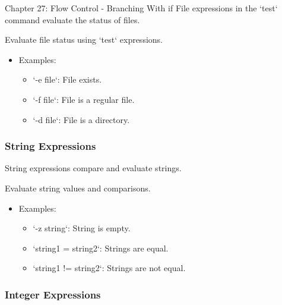 \begin{notes}{Chapter 27: Flow Control - Branching With if}
    File expressions in the `test` command evaluate the status of files.
    
    \begin{highlight}
    
    Evaluate file status using `test` expressions.
    
    \begin{itemize}
        \item Examples:
        \begin{itemize}
            \item `-e file`: File exists.
            \item `-f file`: File is a regular file.
            \item `-d file`: File is a directory.
        \end{itemize}
    \end{itemize}
    
    \end{highlight}
    
    \subsubsection*{String Expressions}
    
    String expressions compare and evaluate strings.
    
    \begin{highlight}
    
    Evaluate string values and comparisons.
    
    \begin{itemize}
        \item Examples:
        \begin{itemize}
            \item `-z string`: String is empty.
            \item `string1 = string2`: Strings are equal.
            \item `string1 != string2`: Strings are not equal.
        \end{itemize}
    \end{itemize}
    
    \end{highlight}
    
    \subsubsection*{Integer Expressions}
    

\end{notes}
